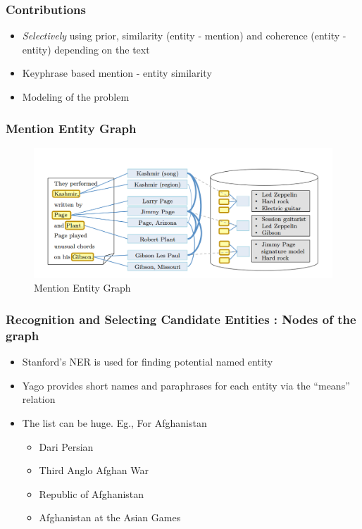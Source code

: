 
\begin{frame}
\frametitle{Contributions}
\begin{itemize}
  \item \emph{Selectively} using prior, similarity (entity - mention) and coherence (entity - entity) 
  depending on the text\bigskip
  \item Keyphrase based mention - entity similarity\bigskip
  \item Modeling of the problem \bigskip
\end{itemize}
\end{frame}

\begin{frame}
 \frametitle{Mention Entity Graph}
 \begin{figure}[h]
 \centering
 \includegraphics[bb=0 0 1074 469,scale=0.3]{./megraph.png}
 \caption{Mention Entity Graph}
\end{figure}


\end{frame}

\begin{frame}
 \frametitle{Recognition and Selecting Candidate Entities : Nodes of the graph}

 \begin{itemize}
  \item  Stanford's NER is used for finding potential named entity \medskip
  \item Yago provides short names and paraphrases for each entity via the ``means'' relation \medskip
  \item The list can be huge. Eg., For Afghanistan \medskip
 \begin{itemize}
 
 \item  Dari Persian 
 \item Third Anglo Afghan War 
\item  Republic of Afghanistan 
 \item Afghanistan at the Asian Games 
\end{itemize}
\end{itemize}
\end{frame}

